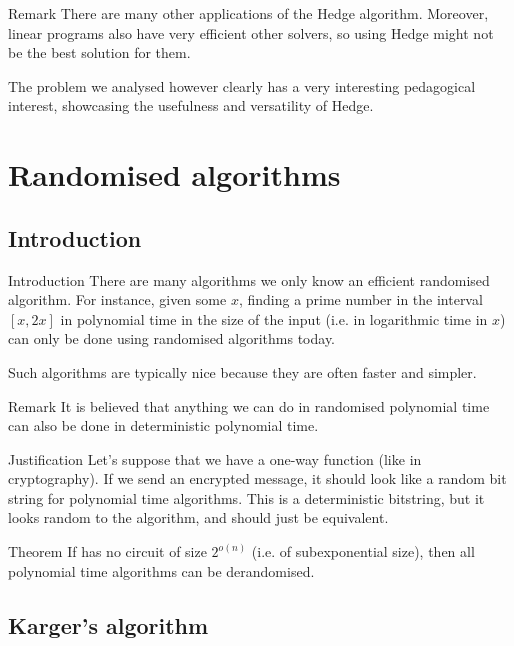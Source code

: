 \documentclass[a4paper]{article}
\begin{document}
\begin{parag}{Remark}
    There are many other applications of the Hedge algorithm. Moreover, linear programs also have very efficient other solvers, so using Hedge might not be the best solution for them. 

    The problem we analysed however clearly has a very interesting pedagogical interest, showcasing the usefulness and versatility of Hedge.
\end{parag}

\section{Randomised algorithms}
\subsection{Introduction}

\begin{parag}{Introduction}
    There are many algorithms we only know an efficient randomised algorithm. For instance, given some $x$, finding a prime number in the interval $\left[x, 2x\right]$ in polynomial time in the size of the input (i.e. in logarithmic time in $x$) can only be done using randomised algorithms today.

    Such algorithms are typically nice because they are often faster and simpler.
\end{parag}

\begin{parag}{Remark}
    It is believed that anything we can do in randomised polynomial time can also be done in deterministic polynomial time.

    \begin{subparag}{Justification}
        Let's suppose that we have a one-way function (like in cryptography). If we send an encrypted message, it should look like a random bit string for polynomial time algorithms. This is a deterministic bitstring, but it looks random to the algorithm, and should just be equivalent.
    \end{subparag}
\end{parag}

\begin{parag}{Theorem}
    If  has no circuit of size $2^{o\left(n\right)}$ (i.e. of subexponential size), then all polynomial time algorithms can be derandomised.
\end{parag}

\subsection{Karger's algorithm}
\end{document}
